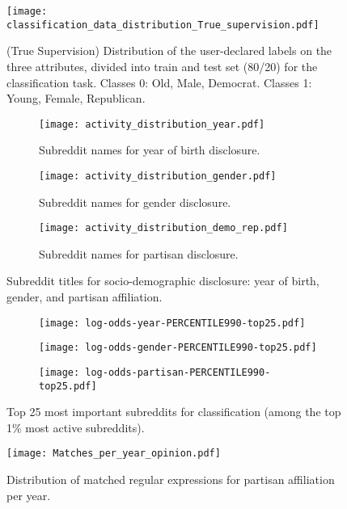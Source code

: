 \begin{figure}
\texttt{[image: classification\_data\_distribution\_True\_supervision.pdf]}
\caption{(True Supervision) Distribution of the user-declared labels on the three attributes, divided into train and test set (80/20) for the classification task. Classes 0: Old, Male, Democrat. Classes 1: Young, Female, Republican.}
\label{fig:class_distr_true}
\end{figure}


\begin{figure}[h!]
    \centering
    \begin{subfigure}[t]{\columnwidth}
        \centering
        \texttt{[image: activity\_distribution\_year.pdf]}
        \caption{Subreddit names for year of birth disclosure.}
        \label{fig:regex1}
    \end{subfigure}

    \begin{subfigure}[t]{\columnwidth}
        \centering
        \texttt{[image: activity\_distribution\_gender.pdf]}
        \caption{Subreddit names for gender disclosure.}
        \label{fig:regex2}
    \end{subfigure}

    \begin{subfigure}[t]{\columnwidth}
        \centering
        \texttt{[image: activity\_distribution\_demo\_rep.pdf]}
        \caption{Subreddit names for partisan disclosure.}
        \label{fig:regex3}
    \end{subfigure}

    \caption{Subreddit titles for socio-demographic disclosure: year of birth, gender, and partisan affiliation.}
    \label{fig:activity_distribution_combined}
\end{figure}



\begin{figure*}[h!]
\begin{subfigure}[t]{0.67\columnwidth}
\texttt{[image: log-odds-year-PERCENTILE990-top25.pdf]}
\caption{}
\label{fig:importance-year}
\end{subfigure}
\begin{subfigure}[t]{0.67\columnwidth}
\texttt{[image: log-odds-gender-PERCENTILE990-top25.pdf]}
\caption{}
\label{fig:importance-gender}
\end{subfigure}
\begin{subfigure}[t]{0.67\columnwidth}
\texttt{[image: log-odds-partisan-PERCENTILE990-top25.pdf]}
\caption{}
\label{fig:importance-partisan}
\end{subfigure}
\caption{Top 25 most important subreddits for classification
(among the top 1\% most active subreddits).}
\end{figure*}






\begin{figure*}[b]
\texttt{[image: Matches\_per\_year\_opinion.pdf]}
\caption{Distribution of matched regular expressions for partisan affiliation per year.}
\label{fig:regex-pol}
\end{figure*}
